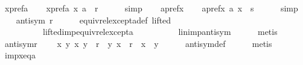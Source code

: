 \begin{isabellebody}
\ x{\isacharunderscore}{\kern0pt}pref{\isacharunderscore}{\kern0pt}a\isanewline
\ \ \isamarkupfalse%
\ x{\isacharunderscore}{\kern0pt}pref{\isacharunderscore}{\kern0pt}a{\isacharunderscore}{\kern0pt}{}{\isacharcolon}{\kern0pt}\ {\isachardoublequoteopen}{\isacharparenleft}{\kern0pt}x{\isacharcomma}{\kern0pt}\ a{\isacharparenright}{\kern0pt}\ {\isasymin}\ r{\isachardoublequoteclose}\isanewline
\ \ \ \ \isamarkupfalse%
\ simp\isanewline
\ \ \isamarkupfalse%
\ a{\isacharunderscore}{\kern0pt}pref{\isacharunderscore}{\kern0pt}x\isanewline
\ \ \isamarkupfalse%
\ a{\isacharunderscore}{\kern0pt}pref{\isacharunderscore}{\kern0pt}x{\isacharunderscore}{\kern0pt}{}{\isacharcolon}{\kern0pt}\ {\isachardoublequoteopen}{\isacharparenleft}{\kern0pt}a{\isacharcomma}{\kern0pt}\ x{\isacharparenright}{\kern0pt}\ {\isasymin}\ s{\isachardoublequoteclose}\isanewline
\ \ \ \ \isamarkupfalse%
\ simp\isanewline
\ \ \isamarkupfalse%
\ {\isachardoublequoteopen}antisym\ r{\isachardoublequoteclose}\isanewline
\ \ \ \ \isamarkupfalse%
\ equiv{\isacharunderscore}{\kern0pt}rel{\isacharunderscore}{\kern0pt}except{\isacharunderscore}{\kern0pt}a{\isacharunderscore}{\kern0pt}def\ lifted\isanewline
\ \ \ \ \ \ \ \ \ \ lifted{\isacharunderscore}{\kern0pt}imp{\isacharunderscore}{\kern0pt}equiv{\isacharunderscore}{\kern0pt}rel{\isacharunderscore}{\kern0pt}except{\isacharunderscore}{\kern0pt}a\isanewline
\ \ \ \ \ \ \ \ \ \ lin{\isacharunderscore}{\kern0pt}imp{\isacharunderscore}{\kern0pt}antisym\isanewline
\ \ \ \ \isamarkupfalse%
\ metis\isanewline
\ \ \isamarkupfalse%
\ antisym{\isacharunderscore}{\kern0pt}r{\isacharcolon}{\kern0pt}\isanewline
\ \ \ \ {\isachardoublequoteopen}{\isacharparenleft}{\kern0pt}{\isasymforall}x\ y{\isachardot}{\kern0pt}\ {\isacharparenleft}{\kern0pt}x{\isacharcomma}{\kern0pt}\ y{\isacharparenright}{\kern0pt}\ {\isasymin}\ r\ {\isasymlongrightarrow}\ {\isacharparenleft}{\kern0pt}y{\isacharcomma}{\kern0pt}\ x{\isacharparenright}{\kern0pt}\ {\isasymin}\ r\ {\isasymlongrightarrow}\ x\ {\isacharequal}{\kern0pt}\ y{\isacharparenright}{\kern0pt}{\isachardoublequoteclose}\isanewline
\ \ \ \ \isamarkupfalse%
\ antisym{\isacharunderscore}{\kern0pt}def\isanewline
\ \ \ \ \isamarkupfalse%
\ metis\isanewline
\ \ \isamarkupfalse%
\ imp{\isacharunderscore}{\kern0pt}x{\isacharunderscore}{\kern0pt}eq{\isacharunderscore}{\kern0pt}a{\isacharunderscore}{\kern0pt}{}{\isacharcolon}{\kern0pt}\isanewline

\end{isabellebody}
